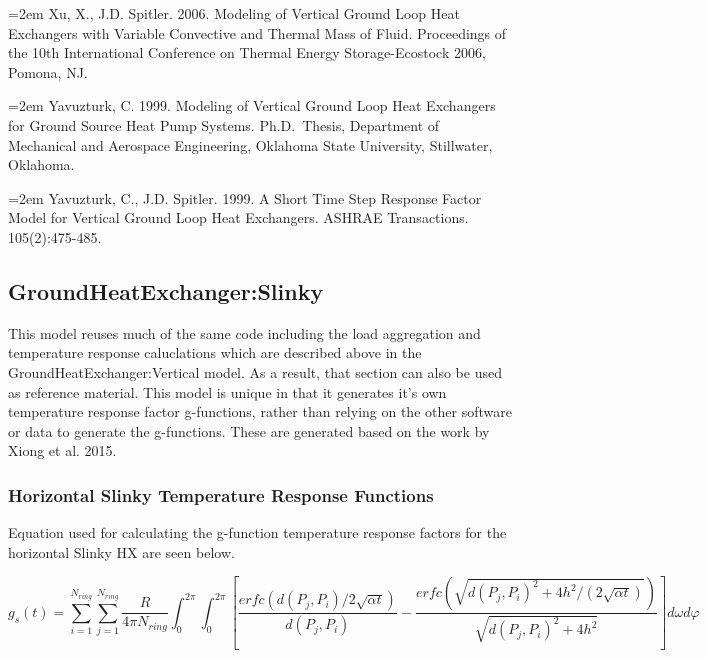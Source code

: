 \hangindent=2em
\noindent Xu, X., J.D. Spitler. 2006. Modeling of Vertical Ground Loop Heat Exchangers with Variable Convective and Thermal Mass of Fluid. Proceedings of the 10th International Conference on Thermal Energy Storage-Ecostock 2006, Pomona, NJ.

\hangindent=2em
\noindent Yavuzturk, C. 1999. Modeling of Vertical Ground Loop Heat Exchangers for Ground Source Heat Pump Systems. Ph.D.~Thesis, Department of Mechanical and Aerospace Engineering, Oklahoma State University, Stillwater, Oklahoma.

\hangindent=2em
\noindent Yavuzturk, C., J.D. Spitler. 1999. A Short Time Step Response Factor Model for Vertical Ground Loop Heat Exchangers. ASHRAE Transactions. 105(2):475-485.

\subsection{GroundHeatExchanger:Slinky}\label{groundheatexchangerslinky}

This model reuses much of the same code including the load aggregation and temperature response caluclations which are described above in the GroundHeatExchanger:Vertical model. As a result, that section can also be used as reference material. This model is unique in that it generates it's own temperature response factor g-functions, rather than relying on the other software or data to generate the g-functions. These are generated based on the work by Xiong et al. 2015.

\subsubsection{Horizontal Slinky Temperature Response Functions}\label{horizontal-slinky-temperature-response-functions}

Equation used for calculating the g-function temperature response factors for the horizontal Slinky HX are seen below.

{\scriptsize
\begin{equation}
g_s\left(t\right) = \sum_{i = 1}^{N_{ring}} \sum_{j = 1}^{N_{ring}} \frac{R}{4\pi N_{ring}} \int_0^{2\pi} \int_0^{2\pi} 
            \left[ 
                \frac{erfc\left(d\left(P_j,P_i\right)/2\sqrt{\alpha t}\right)}{d\left(P_j,P_i\right)} - 
                \frac{erfc\left(\sqrt{d\left(P_j,P_i\right)^2+4h^2/\left(2\sqrt{\alpha t}\right)}\right)}{\sqrt{d\left(P_j,P_i\right)^2+4h^2} }
            \right]d\omega d\varphi
\end{equation}}

